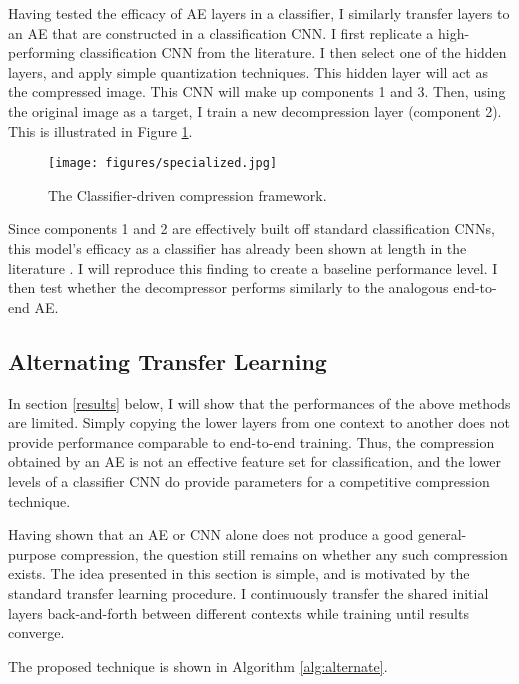 \documentclass[twoside,11pt]{article}
\begin{document}
Having tested the efficacy of AE layers in a classifier, I similarly transfer layers to an
AE that are constructed in a classification CNN.
I first replicate a high-performing classification CNN from the literature. 
I then select one of the hidden layers, and apply simple
quantization techniques. This hidden layer 
will act as the compressed image. This CNN will make up components 1 and 3.
Then, using the original image as a target, I train a new decompression layer (component 2).  
This is illustrated in Figure \ref{fig:specialized}.

\begin{figure}[h]
  \texttt{[image: figures/specialized.jpg]}
  \caption{The Classifier-driven compression framework.}
  \label{fig:specialized}
\end{figure}

Since components 1 and 2 are effectively built off standard classification CNNs, 
this model’s efficacy as a classifier has already been shown at length in the 
literature \citep{krizhevsky2012imagenet}. I will reproduce this finding to create a 
baseline performance level. I then test whether 
the decompressor performs similarly to the analogous end-to-end AE.



\subsection{Alternating Transfer Learning} \label{alternate}

In section \ref{results} below, I will show that the performances of the above methods are limited. 
Simply copying the lower layers from one context to another 
does not provide performance comparable to end-to-end training. 
Thus, the compression obtained by an AE
is not an effective feature set for classification, and the lower levels of a classifier 
CNN do provide parameters for a competitive compression technique. 

Having shown that an AE or CNN alone does not produce a good general-purpose compression,
the question still remains on whether any such compression exists. 
The idea presented in this section is simple, and is motivated by 
the standard transfer learning procedure. I continuously transfer the shared
initial layers back-and-forth between different contexts while training until results converge. 

The proposed technique is shown in Algorithm \ref{alg:alternate}.
\end{document}
